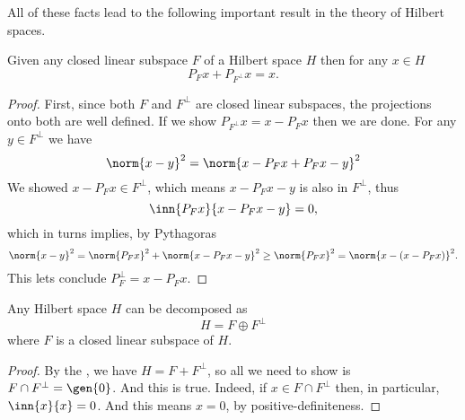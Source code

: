 \documentclass[12pt,oneside]{book}
\begin{document}
All of these facts lead to the following important result in the theory of Hilbert
spaces.
\begin{theorem}\label{theo:projection}
	Given any closed linear subspace \( F \) of a Hilbert space \( H \) then for any \( x
	\in H \)
	\begin{equation*}
		P_F x + P_{F^\perp} x = x.
	\end{equation*}
\end{theorem}
\begin{proof}
	First, since both \( F \) and \( F^\perp \) are closed linear subspaces, the projections
	onto both are well defined. If we show \( P_{F^\perp}x = x - P_F x \) then we are done.
	For any \( y \in F^\perp \) we have
	\begin{equation*}
		\norm{x -y}^2 = \norm{x - P_Fx + P_Fx - y}^2 
	\end{equation*}
	We showed \( x - P_Fx \in F^\perp \), which means \( x-P_Fx - y \) is also in \( F^\perp
	\), thus
	\begin{equation*}
		\inn{P_F x}{x - P_Fx - y} = 0,
	\end{equation*}
	 which in turns implies, by Pythagoras
	\begin{equation*}
		\norm{x -y}^2 = \norm{P_Fx}^2 + \norm{x-P_Fx-y}^2 \geq \norm{P_Fx}^2 = \norm{x -
		(x-P_Fx)}^2.
	\end{equation*}
	This lets conclude \( P_F^\perp = x - P_Fx \). 
\end{proof}
\begin{corollary}
	Any Hilbert space \( H \) can be decomposed as
	\begin{equation*}
		H = F \oplus F^\perp
	\end{equation*}
	where \( F \) is a closed linear subspace of \( H \).
\end{corollary}
\begin{proof}
	By the , we have \( H = F + F^\perp \), so all we need to show
	is \( F \cap F^\perp = \gen{0} \). And this is true. Indeed, if \( x \in F \cap F^\perp
	\) then, in particular, \( \inn{x}{x} = 0 \). And this means \( x = 0 \), by
	positive-definiteness.
\end{proof}
\end{document}
